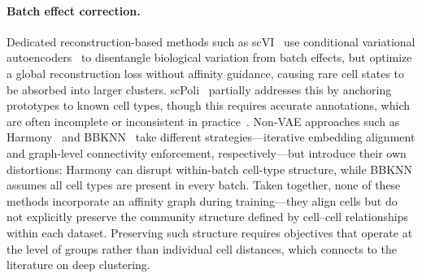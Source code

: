 \paragraph{Batch effect correction.}
Dedicated reconstruction-based methods such as scVI~\citep{scvi} use conditional variational autoencoders~\citep{cvae} to disentangle biological variation from batch effects, but optimize a global reconstruction loss without affinity guidance, causing rare cell states to be absorbed into larger clusters.
scPoli~\citep{scpoli} partially addresses this by anchoring prototypes to known cell types, though this requires accurate annotations, which are often incomplete or inconsistent in practice~\citep{zeng2022cell}.
Non-VAE approaches such as Harmony~\citep{harmony} and BBKNN~\citep{bbknn} take different strategies---iterative embedding alignment and graph-level connectivity enforcement, respectively---but introduce their own distortions: Harmony can disrupt within-batch cell-type structure, while BBKNN assumes all cell types are present in every batch.
Taken together, none of these methods incorporate an affinity graph during training---they align cells but do not explicitly preserve the community structure defined by cell--cell relationships within each dataset.
Preserving such structure requires objectives that operate at the level of groups rather than individual cell distances, which connects to the literature on deep clustering.

